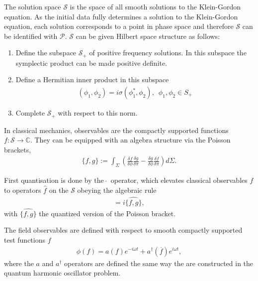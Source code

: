 The solution space  $\mathcal{S}$ is the space of all smooth solutions to the Klein-Gordon equation. As the initial data fully determines a solution to the Klein-Gordon equation, each solution corresponds to a point in phase space and therefore $\mathcal{S}$ can be identified with $\mathcal{P}$.
$\mathcal{S}$ can be given Hilbert space structure as follows: 
\begin{enumerate}
	\item Define the subspace $\mathcal{S}_+$ of positive frequency solutions. In this subspace the symplectic product can be made positive definite.
	\item Define a Hermitian inner product in this subspace 
	\begin{align}
		(\phi_1, \phi_2) = i\sigma(\phi_1^*, \phi_2), \,\,\, \phi_1, \phi_2 \in S_{+}
	\end{align}
\item Complete $\mathcal{S}_+$ with respect to this norm. 
\end{enumerate}
	

In classical mechanics, observables are the compactly supported functions \linebreak $f: \mathcal{S}\rightarrow \mathbb{C}$. They can be equipped with an algebra structure via the Poisson brackets, 
\begin{align}
\{f, g\}  := \int_{\Sigma}^{}  \left( \frac{\delta f}{\delta \phi} \frac{\delta g}{\delta \pi} - \frac{\delta g}{\delta \phi} \frac{\delta f}{\delta \pi}  \right) d\Sigma.
\end{align}

First quantisation is done by the\, $\hat{}$\, operator, which elevates classical observables $f$ to operators $\hat{f}$ on the $\mathcal{S}$ obeying the algebraic rule 
\begin{align}
	[ \hat{f}, \hat{g} ] = i \hat{\{f, g\} },
\end{align}
with $ \hat{\{f, g\} }$ the quantized version of the Poisson bracket.

The field observables are defined with respect to smooth compactly supported test functions $f$
\begin{align}
	\phi(f) = a(f)e^{-i\omega t} + a^\dagger(\overline{f}) e^{i\omega t},
\end{align}
where the $a$ and $a^\dagger$ operators are defined the same way the are constructed in the quantum harmonic oscillator problem. 

